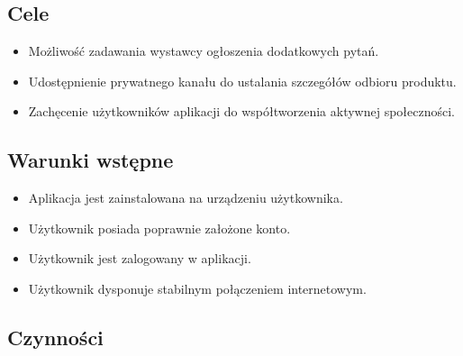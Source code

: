 \documentclass[licencjacka]{pracamgr}
\begin{document}
    \subsection{Cele}
    \begin{itemize}
        \item Możliwość zadawania wystawcy ogłoszenia dodatkowych pytań.
        \item Udostępnienie prywatnego kanału do ustalania szczegółów odbioru produktu.
        \item Zachęcenie użytkowników aplikacji do współtworzenia aktywnej społeczności.
    \end{itemize}
    \subsection{Warunki wstępne}
    \begin{itemize}
        \item Aplikacja jest zainstalowana na urządzeniu użytkownika.
        \item Użytkownik posiada poprawnie założone konto.
        \item Użytkownik jest zalogowany w aplikacji.
        \item Użytkownik dysponuje stabilnym połączeniem internetowym.
    \end{itemize}
    \subsection{Czynności}
\end{document}
